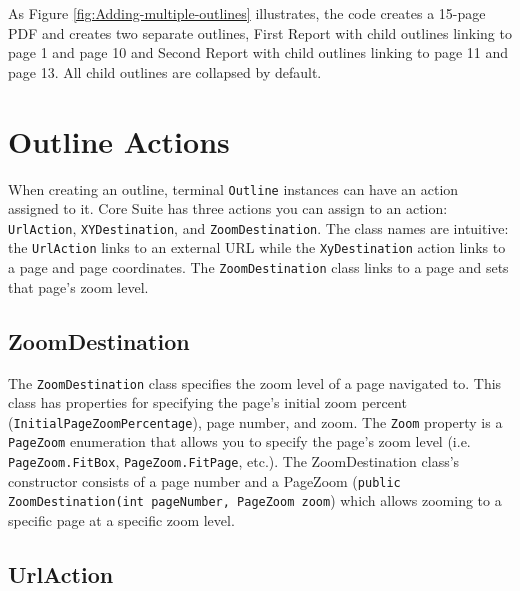 \documentclass[american]{tufte-book}
\numberwithin{equation}{section}
\numberwithin{figure}{section}
\begin{document}
{As Figure \ref{fig:Adding-multiple-outlines} illustrates, the code
creates a 15-page PDF and creates two separate outlines, \textquotedbl First
Report\textquotedbl{} with child outlines linking to page 1 and page
10 and \textquotedbl Second Report\textquotedbl{} with child outlines
linking to page 11 and page 13. All child outlines are collapsed by
default.

\section{Outline Actions}\label{sec:Outline-Actions}

When creating an outline, terminal \texttt{Outline} instances can have an action
assigned to it. Core Suite has three actions you can assign to an
action: \texttt{UrlAction}, \texttt{XYDestination}, and \texttt{ZoomDestination}. The class names are intuitive: the \texttt{UrlAction} links to an
external URL while the \texttt{XyDestination} action links to a page
and page coordinates. The \texttt{ZoomDestination} class links to
a page and sets that page's zoom level.

\subsection{ZoomDestination}

The \texttt{ZoomDestination} class specifies the zoom level of a page
navigated to. This class has properties for specifying the page's
initial zoom percent (\texttt{InitialPageZoomPercentage}), page
number, and zoom. The \texttt{Zoom} property is a \texttt{PageZoom}
enumeration that allows you to specify the page's zoom level (i.e.
\texttt{PageZoom.FitBox}, \texttt{PageZoom.FitPage}, etc.). The ZoomDestination
class's constructor consists of a page number and a PageZoom (\texttt{public
ZoomDestination(int pageNumber, PageZoom zoom}) which allows zooming
to a specific page at a specific zoom level.

\subsection{UrlAction}

}
\end{document}
